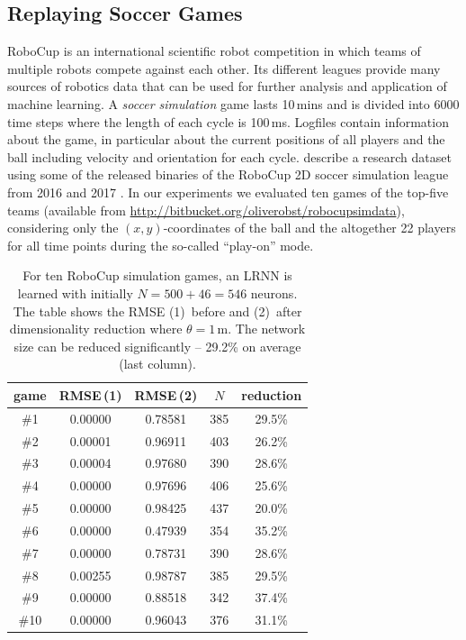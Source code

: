 \documentclass[preprint,12pt,times,authoryear]{elsarticle}%
\theoremstyle{definition}
\newcommand{\head}[1]{\multicolumn{1}{c}{#1}}
\begin{document}
\subsection{Replaying Soccer Games}\label{soccer}

RoboCup \citep{KA+97} is an international scientific robot competition in which
teams of multiple robots compete against each other. Its different leagues
provide many sources of robotics data that can be used for further analysis and
application of machine learning. A \emph{soccer simulation} game lasts 10\,mins and is
divided into 6000 time steps where the length of each cycle is 100\,ms. Logfiles
contain information about the game, in particular about the current positions of
all players and the ball including velocity and orientation for each cycle.
\citet{MO+19} describe a research dataset using some of the released binaries of
the RoboCup 2D soccer simulation league \citep{CDF+03,GFG16} from 2016 and 2017
\citep{MO+18}. In our experiments we evaluated ten games of the
top-five teams (available from \url{http://bitbucket.org/oliverobst/robocupsimdata}),
considering only the $(x,y)$-coordinates of the ball and the altogether 22
players for all time points during the so-called \enquote{play-on}
mode.

\begin{table}
\centering\footnotesize
{}%
\begin{tabular}[b]{cSScc}
	\toprule
	\head{game} & \head{RMSE\,(1)} & \head{RMSE\,(2)} & \head{$N$} & \head{reduction}\\ \midrule
	\#1 & 0.00000 & 0.78581 & 385 & 29.5\%\\
	\#2 & 0.00001 & 0.96911 & 403 & 26.2\% \\
	\#3 & 0.00004 & 0.97680 & 390 & 28.6\% \\
	\#4 & 0.00000 & 0.97696 & 406 & 25.6\% \\
	\#5 & 0.00000 & 0.98425 & 437 & 20.0\% \\
	\#6 & 0.00000 & 0.47939 & 354 & 35.2\% \\
	\#7 & 0.00000 & 0.78731 & 390 & 28.6\% \\
	\#8 & 0.00255 & 0.98787 & 385 & 29.5\% \\
	\#9 & 0.00000 & 0.88518 & 342 & 37.4\% \\
	\#10 & 0.00000 & 0.96043 & 376 & 31.1\% \\
	\bottomrule
  \end{tabular}
  \caption{For ten RoboCup simulation games, an LRNN is learned with initially
	$N = 500+46 = 546$ neurons. The table shows the RMSE
	(1)~before and (2)~after dimensionality reduction where $\theta=1$\,m. The
	network size can be reduced significantly -- 29.2\% on average
	(last column).}
  \label{robocup}
\end{table}
\end{document}
